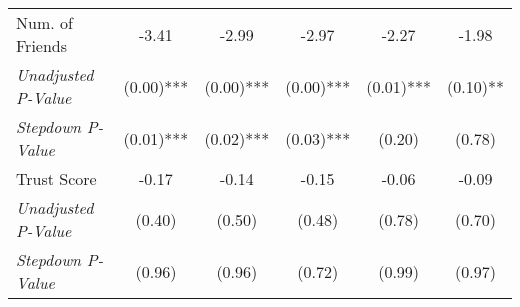 \begin{tabular}{l c c c c c}
Num. of Friends & -3.41 & -2.99 & -2.97 & -2.27 & -1.98 \\
\quad \textit{Unadjusted P-Value} & (0.00)*** & (0.00)*** & (0.00)*** & (0.01)*** & (0.10)** \\
\quad \textit{Stepdown P-Value} & (0.01)*** & (0.02)*** & (0.03)*** & (0.20) & (0.78) \\
Trust Score & -0.17 & -0.14 & -0.15 & -0.06 & -0.09 \\
\quad \textit{Unadjusted P-Value} & (0.40) & (0.50) & (0.48) & (0.78) & (0.70) \\
\quad \textit{Stepdown P-Value} & (0.96) & (0.96) & (0.72) & (0.99) & (0.97) \\
\bottomrule
\end{tabular}
